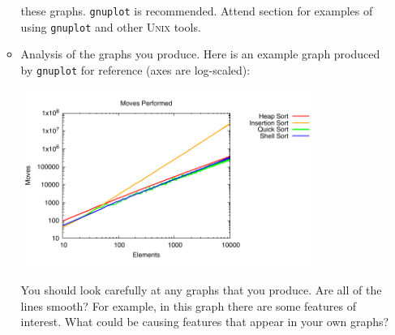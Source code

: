 \begin{enumerate}
\begin{itemize}
        these graphs. \texttt{gnuplot} is recommended. Attend section
        for examples of using \texttt{gnuplot} and other \textsc{Unix}
        tools.
      \item Analysis of the graphs you produce. Here is an example graph
        produced by \texttt{gnuplot} for reference (axes are
        log-scaled):
        \begin{center}
          \includegraphics[width=0.8\textwidth]{images/moves.pdf} \\
        \end{center}
        You should look carefully at any graphs that you produce. Are
        all of the lines smooth? For example, in this graph there are
        some features of interest. What could be causing features that
        appear in your own graphs?
    \end{itemize}
\end{enumerate}
